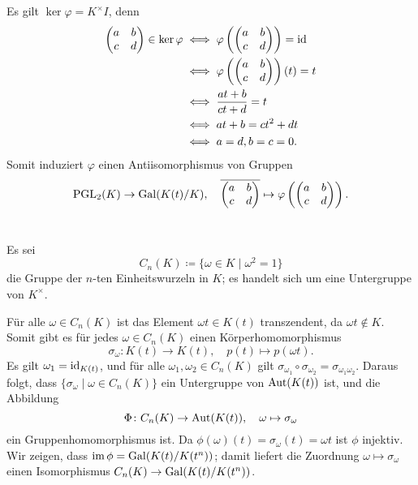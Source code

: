 \documentclass[a4paper,10pt,numbers=noenddot]{scrartcl}
\begin{document}
Es gilt $\ker \varphi = K^\times I$, denn
\begin{align*}
        \begin{pmatrix}
          a & b
          \\
          c & d
        \end{pmatrix}
        \in
        \ker \varphi
  &\iff
        \varphi
        \left(
          \begin{pmatrix}
            a & b
            \\
            c & d
          \end{pmatrix}
        \right)
        =
        \operatorname{id}
  \\
  &\iff
        \varphi
        \left(
          \begin{pmatrix}
            a & b
            \\
            c & d
          \end{pmatrix}
        \right)
        (t)
        =
        t
  \\
  &\iff
        \frac{at+b}{ct+d} = t
  \\
  &\iff
        at + b = ct^2 + dt
  \\
  &\iff
        a = d, b = c = 0.
\end{align*}
Somit induziert $\varphi$ einen Antiisomorphismus von Gruppen
\[
  \operatorname{PGL}_2(K) \to \operatorname{Gal}(K(t)/K),
  \quad
  \overline{
  \begin{pmatrix}
    a & b
    \\
    c & d
  \end{pmatrix}
  }
  \mapsto
  \varphi
  \left(
    \begin{pmatrix}
      a & b
      \\
      c & d
    \end{pmatrix}
  \right).
\]





\section{}

Es sei
\[
            C_n(K)
  \coloneqq \{ \omega \in K \mid \omega^2 = 1 \}
\]
die Gruppe der $n$-ten Einheitswurzeln in $K$;
es handelt sich um eine Untergruppe von $K^\times$.

Für alle $\omega \in C_n(K)$ ist das Element $\omega t \in K(t)$ transzendent, da $\omega t \notin K$.
Somit gibt es für jedes $\omega \in C_n(K)$ einen Körperhomomorphismus
\[
          \sigma_\omega
  \colon  K(t) \to K(t),
  \quad   p(t) \mapsto p(\omega t).
\]
Es gilt $\omega_1 = \operatorname{id}_{K(t)}$, und für alle $\omega_1, \omega_2 \in C_n(K)$ gilt $\sigma_{\omega_1} \circ \sigma_{\omega_2} = \sigma_{\omega_1 \omega_2}$.
Daraus folgt, dass $\{\sigma_\omega \mid \omega \in C_n(K)\}$ ein Untergruppe von $\operatorname{Aut}(K(t))$ ist, und die Abbildung
\[
          \Phi
  \colon  C_n(K) \to \operatorname{Aut}(K(t)),
  \quad   \omega \mapsto \sigma_\omega
\]
ein Gruppenhomomorphismus ist.
Da $\phi(\omega)(t) = \sigma_\omega(t) = \omega t$ ist $\phi$ injektiv.
Wir zeigen, dass $\operatorname{im} \phi = \operatorname{Gal}(K(t) / K(t^n))$;
damit liefert die Zuordnung $\omega \mapsto \sigma_\omega$ einen Isomorphismus $C_n(K) \to \operatorname{Gal}(K(t) / K(t^n))$.
\end{document}
